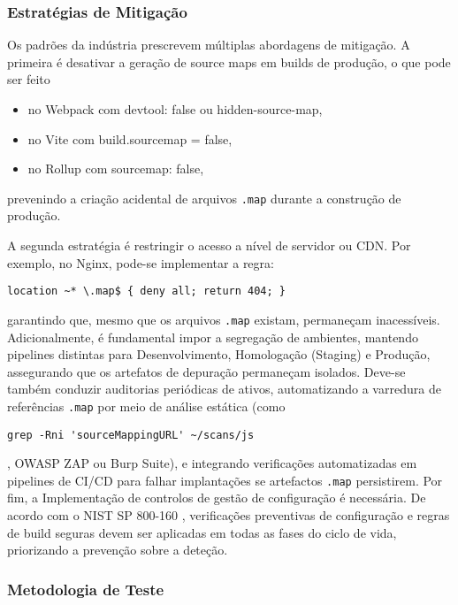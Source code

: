 \subsubsection{Estratégias de Mitigação}

Os padrões da indústria prescrevem múltiplas abordagens de mitigação. A primeira é desativar a geração de source maps em builds de produção, o que pode ser feito 
\begin{itemize}
\item no Webpack com devtool: false ou hidden-source-map, 
\item no Vite com build.sourcemap = false, 
\item no Rollup com sourcemap: false, 
\end{itemize}
prevenindo a criação acidental de arquivos \texttt{.map} durante a construção de produção. 

A segunda estratégia é restringir o acesso a nível de servidor ou CDN. Por exemplo, no Nginx, pode-se implementar a regra:  

\begin{verbatim}
location ~* \.map$ { deny all; return 404; }
\end{verbatim}

garantindo que, mesmo que os arquivos \texttt{.map} existam, permaneçam inacessíveis. Adicionalmente, é fundamental impor a segregação de ambientes, mantendo pipelines distintas para Desenvolvimento, Homologação (Staging) e Produção, assegurando que os artefatos de depuração permaneçam isolados. Deve-se também conduzir auditorias periódicas de ativos, automatizando a varredura de referências \texttt{.map} por meio de análise estática (como 

\begin{verbatim}
grep -Rni 'sourceMappingURL' ~/scans/js
\end{verbatim}

, OWASP ZAP ou Burp Suite), e integrando verificações automatizadas em pipelines de CI/CD para falhar implantações se artefactos \texttt{.map} persistirem. Por fim, a Implementação de controlos de gestão de configuração é necessária. De acordo com o NIST SP 800-160 \cite{ref45}, verificações preventivas de configuração e regras de build seguras devem ser aplicadas em todas as fases do ciclo de vida, priorizando a prevenção sobre a deteção. 

\subsubsection{Metodologia de Teste}

